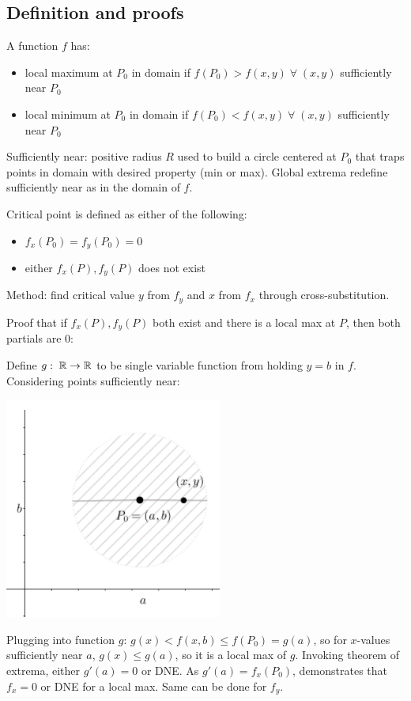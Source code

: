 \subsection{Definition and proofs}

A function $f$ has:
\begin{itemize}
    \item local maximum at $P_0$ in domain if $f(P_0)>f(x,y)\;\forall\;(x,y)$ sufficiently near $P_0$
    \item local minimum at $P_0$ in domain if $f(P_0)<f(x,y)\;\forall\;(x,y)$ sufficiently near $P_0$
\end{itemize}

Sufficiently near: positive radius $R$ used to build a circle centered at $P_0$ that traps points in domain with desired property (min or max).
Global extrema redefine sufficiently near as in the domain of $f$.

Critical point is defined as either of the following:
\begin{itemize}
    \item $f_x(P_0)=f_y(P_0)=0$
    \item either $f_x(P),f_y(P)$ does not exist
\end{itemize}

Method: find critical value $y$ from $f_y$ and $x$ from $f_x$ through cross-substitution.

Proof that if $f_x(P),f_y(P)$ both exist and there is a local max at $P$, then both partials are 0:

Define $g:\;\mathbb{R}\rightarrow \mathbb{R}$ to be single variable function from holding $y=b$ in $f$. Considering points sufficiently near:

\includegraphics[scale=0.5]{figures/Screen Shot 2021-03-21 at 7.55.34 PM.png}

Plugging into function $g$: $g(x) < f(x,b) \leq f(P_0)=g(a)$, so for $x$-values sufficiently
near $a$, $g(x)\leq g(a)$, so it is a local max of $g$. Invoking theorem of extrema, either $g'(a)=0$ or DNE. As $g'(a)=f_x(P_0)$, demonstrates that
$f_x=0$ or DNE for a local max. Same can be done for $f_y$.

